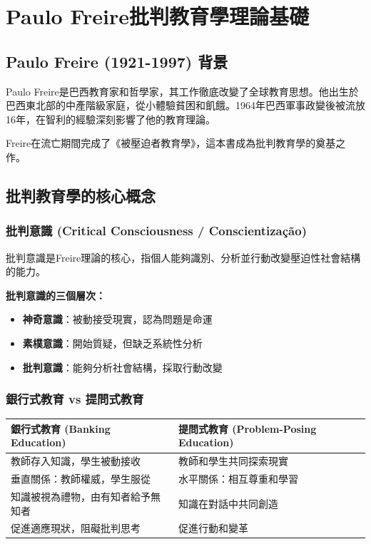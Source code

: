 \documentclass[12pt,a4paper]{article}
\newcommand{\note}[1]{
    \par
    \noindent
    \begin{tcolorbox}[
        colback=brazil_blue!5!white,
        colframe=brazil_blue,
        title=\textbf{重點提醒},
        fonttitle=\bfseries,
        boxrule=0.5pt,
        arc=3pt,
        left=6pt,
        right=6pt,
        top=6pt,
        bottom=6pt
    ]
    #1
    \end{tcolorbox}
}
\begin{document}
\section{Paulo Freire批判教育學理論基礎}

\subsection{Paulo Freire (1921-1997) 背景}
Paulo Freire是巴西教育家和哲學家，其工作徹底改變了全球教育思想。他出生於巴西東北部的中產階級家庭，從小體驗貧困和飢餓。1964年巴西軍事政變後被流放16年，在智利的經驗深刻影響了他的教育理論。

\vspace{0.5cm}
\note{
Freire在流亡期間完成了《被壓迫者教育學》，這本書成為批判教育學的奠基之作。
}

\subsection{批判教育學的核心概念}

\subsubsection{批判意識 (Critical Consciousness / Conscientização)}
批判意識是Freire理論的核心，指個人能夠識別、分析並行動改變壓迫性社會結構的能力。

\textbf{批判意識的三個層次：}
\begin{itemize}[nosep]
    \item \textbf{神奇意識}：被動接受現實，認為問題是命運
    \item \textbf{素樸意識}：開始質疑，但缺乏系統性分析
    \item \textbf{批判意識}：能夠分析社會結構，採取行動改變
\end{itemize}

\subsubsection{銀行式教育 vs 提問式教育}

\begin{longtable}{p{7cm}|p{7cm}}
    \toprule
    \textbf{銀行式教育 (Banking Education)} & \textbf{提問式教育 (Problem-Posing Education)} \\
    \midrule
    \endhead
    教師存入知識，學生被動接收 & 教師和學生共同探索現實 \\
    垂直關係：教師權威，學生服從 & 水平關係：相互尊重和學習 \\
    知識被視為禮物，由有知者給予無知者 & 知識在對話中共同創造 \\
    促進適應現狀，阻礙批判思考 & 促進行動和變革 \\
    \bottomrule
\end{longtable}
\end{document}
